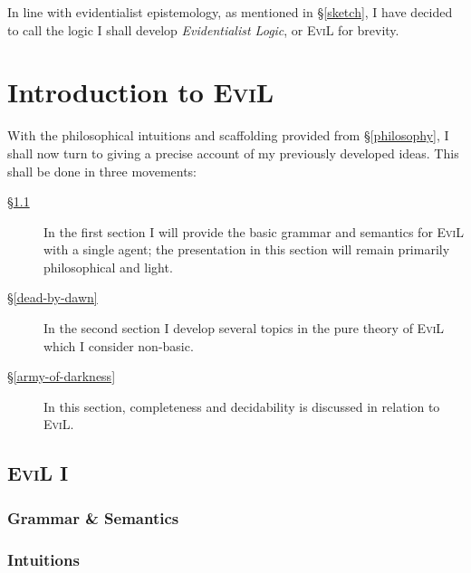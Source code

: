 \documentclass[11pt]{article}
\numberwithin{equation}{subsection}
\begin{document}
In line with evidentialist epistemology, as mentioned in
\S\ref{sketch}, I have decided to call the logic I shall develop
\emph{Evidentialist Logic}, or \textsc{EviL} for brevity.

\section{Introduction to \textsc{EviL}}\label{evil-semantics}
With the philosophical intuitions and scaffolding provided from
\S\ref{philosophy}, I shall now turn to giving a precise account of my previously
developed ideas.  This shall be done in three movements:
\begin{description}
 \item[\S\ref{basic-evil}]  In the first section I will provide the
   basic grammar and semantics for \textsc{EviL} with a single agent;
   the presentation in this section will remain primarily
   philosophical and light.
 \item[\S\ref{dead-by-dawn}]  In the second section I develop several
   topics in the pure theory of \textsc{EviL} which I consider
   non-basic.
  \item[\S\ref{army-of-darkness}]  In this section, completeness and
    decidability is discussed in relation to \textsc{EviL}.
\end{description}


\subsection{\textsc{EviL} I}\label{basic-evil}
\subsubsection{Grammar \& Semantics}\label{evil-grammar}

\subsubsection{Intuitions}

\end{document}
